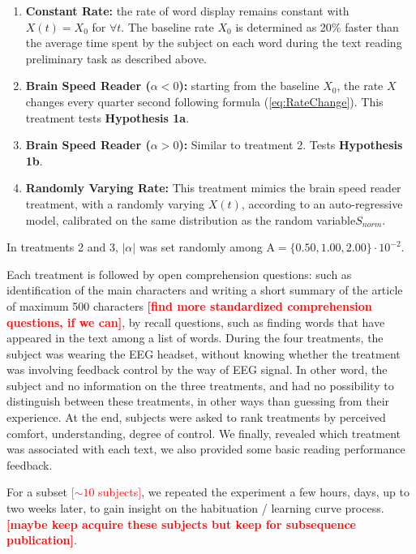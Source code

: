 \begin{enumerate}
  \item {\bf Constant Rate: } the rate of word display remains constant with $X(t) = X_{0}$ for $\forall t$. The baseline rate $X_{0}$ is determined as 20\% faster than the average time spent by the subject on each word during the text reading preliminary task as described above.
  \item {\bf Brain Speed Reader ($\alpha <0$): } starting from the baseline $X_0$, the rate $X$ changes every quarter second following formula (\ref{eq:RateChange}). This treatment tests {\bf Hypothesis 1a}.
 \item {\bf Brain Speed Reader ($\alpha > 0$): } Similar to treatment 2. Tests {\bf Hypothesis 1b}.
 \item {\bf Randomly Varying Rate: } This treatment mimics the brain speed reader treatment, with a randomly varying $X(t)$, according to an auto-regressive model, calibrated on the same distribution as the random variable$S_{norm}$.
\end{enumerate}

In treatments {2} and { 3}, $|\alpha|$ was set randomly among $\mathrm{A} = \{0.50, 1.00, 2.00 \}\cdot10^{-2}$.

Each treatment is followed by open comprehension questions: such as identification of the main characters and writing a short summary of the article of maximum 500 characters  \textcolor{red}{\bf [find more standardized comprehension questions, if we can]}, by recall questions, such as finding words that have appeared in the text among a list of words. During the four treatments, the subject was wearing the EEG headset, without knowing whether the treatment was involving feedback control by the way of EEG signal. In other word, the subject and no information on the three treatments, and had no possibility to distinguish between these treatments, in other ways than guessing from their experience. At the end, subjects were asked to rank treatments by perceived comfort, understanding, degree of control. We finally, revealed which treatment was associated with each text, we also provided some basic reading performance feedback.

For a subset \textcolor{red}{[$\sim 10$ subjects]}, we repeated the experiment a few hours, days, up to two weeks later, to gain insight on the habituation / learning curve process. \textcolor{red}{\bf [maybe keep acquire these subjects but keep for subsequence publication]}.



